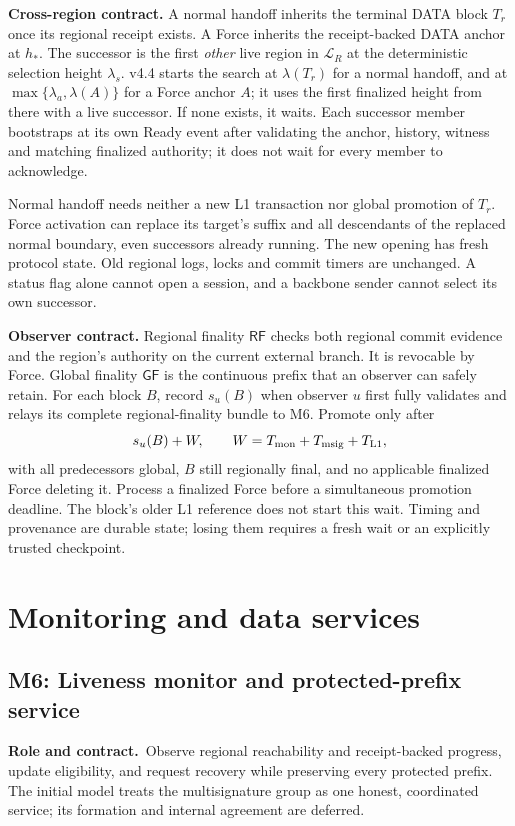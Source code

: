 \documentclass[11pt,a4paper]{article}
\newcommand{\GF}{\mathsf{GF}}
\newcommand{\RF}{\mathsf{RF}}
\newcommand{\role}{\textbf{Role and contract.}\ }
\begin{document}
\textbf{Cross-region contract.} A normal handoff inherits the terminal
DATA block $T_r$ once its regional receipt exists. A Force inherits the
receipt-backed DATA anchor at $h_*$. The successor is the first
\emph{other} live region in $\mathcal L_R$ at the deterministic selection
height $\lambda_s$. v4.4 starts the search at $\lambda(T_r)$ for a normal
handoff, and at $\max\{\lambda_a,\lambda(A)\}$ for a Force anchor $A$;
it uses the first finalized height from there with a live successor.
If none exists, it waits. Each successor member bootstraps at its own
Ready event after validating the anchor, history, witness and matching
finalized authority; it does not wait for every member to acknowledge.

Normal handoff needs neither a new L1 transaction nor global promotion
of $T_r$. Force activation can replace its target's suffix and all
descendants of the replaced normal boundary, even successors already
running. The new opening has fresh protocol state. Old regional logs,
locks and commit timers are unchanged. A status flag alone cannot open
a session, and a backbone sender cannot select its own successor.

\textbf{Observer contract.} Regional finality $\RF$ checks both regional
commit evidence and the region's authority on the current external
branch. It is revocable by Force. Global finality $\GF$ is the continuous
prefix that an observer can safely retain. For each block $B$, record
$s_u(B)$ when observer $u$ first fully validates and relays its complete
regional-finality bundle to M6. Promote only after
\[
 s_u(B)+W,\qquad W=T_{\rm mon}+T_{\rm msig}+T_{\rm L1},
\]
with all predecessors global, $B$ still regionally final, and no
applicable finalized Force deleting it. Process a finalized Force before
a simultaneous promotion deadline. The block's older L1 reference does
not start this wait. Timing and provenance are durable state; losing
them requires a fresh wait or an explicitly trusted checkpoint.

\section{Monitoring and data services}\label{sec:services}
\subsection{M6: Liveness monitor and protected-prefix service}\label{sec:monitor}
\role Observe regional reachability and receipt-backed progress, update
eligibility, and request recovery while preserving every protected
prefix. The initial model treats the multisignature group as one honest,
coordinated service; its formation and internal agreement are deferred.
\end{document}
